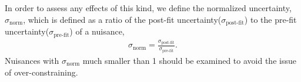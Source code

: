 In order to assess any effects of this kind, we define the 
normalized uncertainty, $\sigma_{\textrm{norm}}$, which is defined as a 
ratio of the post-fit uncertainty($\sigma_{\textrm{post-fit}}$) 
to the pre-fit uncertainty($\sigma_{\textrm{pre-fit}}$) of a nuisance, 
\begin{eqnarray} 
\sigma_{\textrm{norm}} = \frac{\sigma_{\textrm{post-fit}}}{\sigma_{\textrm{pre-fit}}}. 
\end{eqnarray} 
Nuisances with $\sigma_{\textrm{norm}}$ much smaller than 1 should be 
examined to avoid the issue of over-constraining. 


\begin{figure}[!hbtp]
\centering
{}\\
\end{figure}
